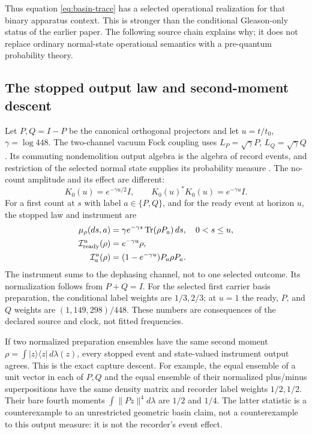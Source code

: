 \documentclass[11pt]{article}
\newcommand{\Tr}{\operatorname{Tr}}
\begin{document}
Thus equation \eqref{eq:basin-trace} has a selected operational realization for
that binary apparatus context. This is stronger than the conditional
Gleason-only status of the earlier paper. The following source chain explains
why; it does not replace ordinary normal-state operational semantics with a
pre-quantum probability theory.

\subsection{The stopped output law and second-moment descent}
\label{sec:frozen-output}
Let \(P,Q=I-P\) be the canonical orthogonal projectors and let
\(u=t/t_0\), \(\gamma=\log448\). The two-channel vacuum Fock coupling uses
\(L_P=\sqrt\gamma P\), \(L_Q=\sqrt\gamma Q\). Its commuting nondemolition
output algebra is the algebra of record events, and restriction of the
selected normal state supplies its probability measure
\cite{FrozenFock}. The no-count amplitude and its effect are different:
\[
K_0(u)=e^{-\gamma u/2}I,\qquad K_0(u)^*K_0(u)=e^{-\gamma u}I.
\]
For a first count at \(s\) with label \(a\in\{P,Q\}\), and for the ready
event at horizon \(u\), the stopped law and instrument are
\[
\begin{aligned}
\mu_\rho(ds,a)&=\gamma e^{-\gamma s}\Tr(\rho P_a)\,ds,\quad 0<s\leq u,\\
\mathcal I_{\rm ready}^{u}(\rho)&=e^{-\gamma u}\rho,\\
\mathcal I_a^u(\rho)&=(1-e^{-\gamma u})P_a\rho P_a.
\end{aligned}
\]
The instrument sums to the dephasing channel, not to one selected outcome.
Its normalization follows from \(P+Q=I\). For the selected first carrier
basis preparation, the conditional label weights are \(1/3,2/3\); at
\(u=1\) the ready, \(P\), and \(Q\) weights are
\((1,149,298)/448\). These numbers are consequences of the declared source
and clock, not fitted frequencies.

If two normalized preparation ensembles have the same second moment
\(\rho=\int |z\rangle\langle z|\,d\lambda(z)\), every stopped event and
state-valued instrument output agrees. This is the exact capture descent.
For example, the equal ensemble of a unit vector in each of \(P,Q\) and
the equal ensemble of their normalized plus/minus superpositions have the
same density matrix and recorder label weights \(1/2,1/2\). Their bare
fourth moments \(\int\|Pz\|^4d\lambda\) are \(1/2\) and \(1/4\).
The latter statistic is a counterexample to an unrestricted geometric basin
claim, not a counterexample to this output measure: it is not the recorder's
event effect.
\end{document}
